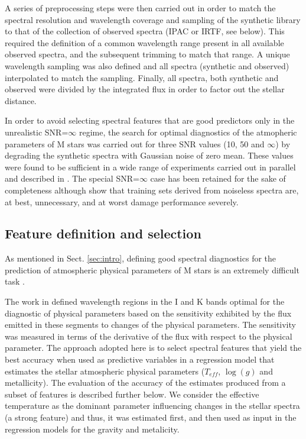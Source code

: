 A series of preprocessing steps were then carried out in order to
match the spectral resolution and wavelength coverage and sampling of
the synthetic library to that of the collection of observed spectra
(IPAC or IRTF, see below). This required the definition of a common
wavelength range present in all available observed spectra, and the
subsequent trimming to match that range. A unique wavelength sampling
was also defined and all spectra (synthetic and observed) interpolated
to match the sampling. Finally, all spectra, both synthetic and
observed were divided by the integrated flux in order to factor out
the stellar distance.

In order to avoid selecting spectral features that are good predictors
only in the unrealistic SNR=$\infty$ regime, the search for optimal
diagnostics of the atmopheric parameters of M stars was carried out
for three SNR values (10, 50 and $\infty$) by degrading the synthetic
spectra with Gaussian noise of zero mean. These values were found to
be sufficient in a wide range of experiments carried out in parallel
and described in \cite{}. The special SNR=$\infty$ case has been
retained for the sake of completeness although \cite{} show that
training sets derived from noiseless spectra are, at best,
unnecessary, and at worst damage performance severely. 

\subsection{Feature definition and selection}
\label{subsec:FD}

As mentioned in Sect. \ref{sec:intro}, defining good spectral
diagnostics for the prediction of atmospheric physical parameters of M
stars is an extremely difficult task .

The work in \cite{cesetti} defined wavelength regions in the I and K
bands optimal for the diagnostic of physical parameters based on the
sensitivity exhibited by the flux emitted in these segments to changes
of the physical parameters. The sensitivity was measured in terms of
the derivative of the flux with respect to the physical parameter. The
approach adopted here is to select spectral features that yield the
best accuracy when used as predictive variables in a regression model
that estimates the stellar atmospheric physical parameters ($T_{eff}$,
$\log(g)$ and metallicity). The evaluation of the accuracy of the
estimates produced from a subset of features is described further
below. We consider the effective temperature as the dominant parameter
influencing changes in the stellar spectra (a strong feature) and
thus, it was estimated first, and then used as input in the regression
models for the gravity and metalicity.

